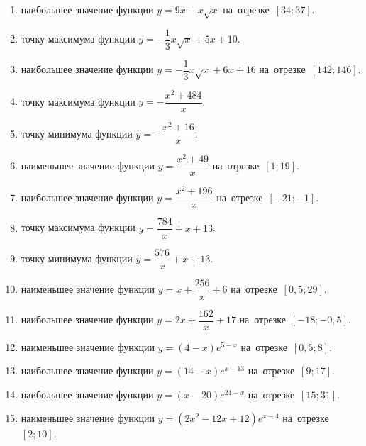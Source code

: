 \documentclass[a4paper,10pt]{article}
\begin{document}
\begin{enumerate}
\item {} наибольшее значение функции $y=9x -x\sqrt{x}$ на~отрезке~$\left[34;37\right]$.

\item {} точку максимума функции $y=-\dfrac{1}{3}x\sqrt{x} +5x+10$.

\item {} наибольшее значение функции $y=-\dfrac{1}{3}x\sqrt{x} +6x+16$ на~отрезке~$\left[142;146\right]$.

\item {} точку максимума функции $y=-\dfrac{x^2 +484}{x}$.

\item {} точку минимума функции $y=-\dfrac{x^2 +16}{x}$.

\item {} наименьшее значение функции $y=\dfrac{x^2 +49}{x}$ на~отрезке~$\left[1;19\right]$.

\item {} наибольшее значение функции $y=\dfrac{x^2 +196}{x}$ на~отрезке~$\left[-21;-1\right]$.

\item {} точку максимума функции $y=\dfrac{784}{x} +x+13$.

\item {} точку минимума функции $y=\dfrac{576}{x} +x+13$.

\item {} наименьшее значение функции $y=x+\dfrac{256}{x} +6$ на~отрезке~$\left[0,5;29\right]$.

\item {} наибольшее значение функции $y=2x+\dfrac{162}{x} +17$ на~отрезке~$\left[-18;-0,5\right]$.

\item {} наименьшее значение функции $y=\left(4-x\right)e^{5-x}$ на~отрезке~$\left[0,5;8\right]$.

\item {} наибольшее значение функции $y=\left(14-x\right)e^{x-13}$ на~отрезке~$\left[9;17\right]$.

\item {} наибольшее значение функции $y=\left(x-20\right)e^{21-x}$ на~отрезке~$\left[15;31\right]$.

\item {} наименьшее значение функции $y=\left(2x^2 -12x +12\right)e^{x -4}$ на~отрезке~$\left[2;10\right]$.


\end{enumerate}
\end{document}
